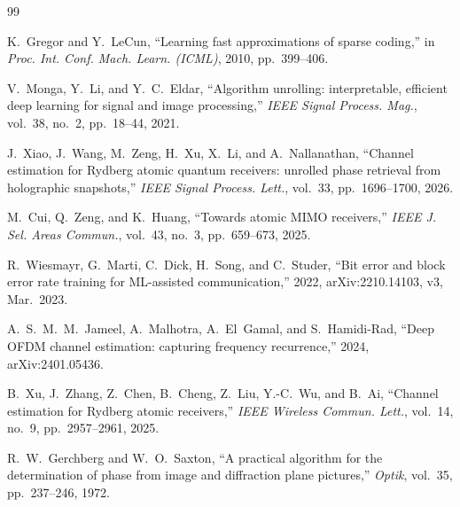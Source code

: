 \documentclass[journal]{IEEEtran}
\begin{document}
\begin{thebibliography}{99}

 K.~Gregor and Y.~LeCun, ``Learning fast approximations of
sparse coding,'' in \emph{Proc. Int. Conf. Mach. Learn. (ICML)}, 2010,
pp.~399--406.

 V.~Monga, Y.~Li, and Y.~C.~Eldar, ``Algorithm unrolling:
interpretable, efficient deep learning for signal and image processing,''
\emph{IEEE Signal Process. Mag.}, vol.~38, no.~2, pp.~18--44, 2021.

 J.~Xiao, J.~Wang, M.~Zeng, H.~Xu, X.~Li, and
A.~Nallanathan, ``Channel estimation for Rydberg atomic quantum receivers:
unrolled phase retrieval from holographic snapshots,'' \emph{IEEE Signal
Process. Lett.}, vol.~33, pp.~1696--1700, 2026.

 M.~Cui, Q.~Zeng, and K.~Huang, ``Towards atomic MIMO
receivers,'' \emph{IEEE J. Sel. Areas Commun.}, vol.~43, no.~3, pp.~659--673,
2025.

 R.~Wiesmayr, G.~Marti, C.~Dick, H.~Song, and
C.~Studer, ``Bit error and block error rate training for ML-assisted
communication,'' 2022, arXiv:2210.14103, v3, Mar.~2023.

 A.~S.~M.~M.~Jameel, A.~Malhotra, A.~El~Gamal, and
S.~Hamidi-Rad, ``Deep OFDM channel estimation: capturing frequency
recurrence,'' 2024, arXiv:2401.05436.

 B.~Xu, J.~Zhang, Z.~Chen, B.~Cheng, Z.~Liu, Y.-C.~Wu, and
B.~Ai, ``Channel estimation for Rydberg atomic receivers,'' \emph{IEEE Wireless
Commun. Lett.}, vol.~14, no.~9, pp.~2957--2961, 2025.

 R.~W.~Gerchberg and W.~O.~Saxton, ``A practical
algorithm for the determination of phase from image and diffraction plane
pictures,'' \emph{Optik}, vol.~35, pp.~237--246, 1972.

\end{thebibliography}
\end{document}
